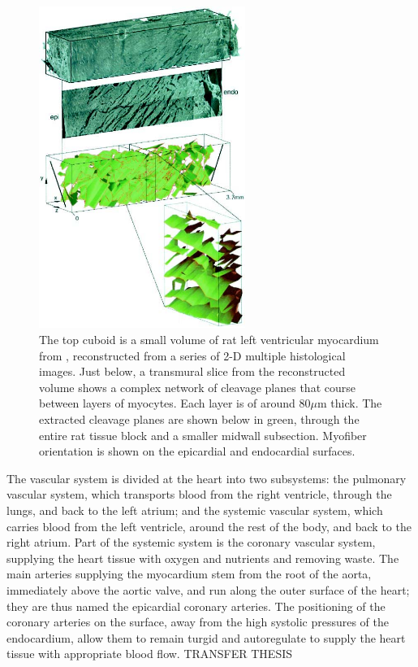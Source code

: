   \begin{figure}[htbp]
    \centering
    \includegraphics[width=0.6\textwidth]{Ch2/Figs/sheets}
    \caption{The top cuboid is a small volume of rat left ventricular myocardium from \cite{Hooks2002}, reconstructed from a series of 2-D multiple histological images. Just below, a transmural slice from the reconstructed volume shows a complex network of cleavage planes that course between layers of myocytes. Each layer is of around 80$\mu$m thick. The extracted cleavage planes are shown below in green, through the entire rat tissue block and a smaller midwall subsection. Myofiber orientation is shown on the epicardial and endocardial surfaces.}
    \label{fig:sheets}
  \end{figure}

  The vascular system is divided at the heart into two subsystems: the pulmonary vascular system, which transports blood from the right ventricle, through the lungs, and back to the left atrium; and the systemic vascular system, which carries blood from the left ventricle, around the rest of the body, and back to the right atrium. Part of the systemic system is the coronary vascular system, supplying the heart tissue with oxygen and nutrients and removing waste. The main arteries supplying the myocardium stem from the root of the aorta, immediately above the aortic valve, and run along the outer surface of the heart; they are thus named the epicardial coronary arteries. The positioning of the coronary arteries on the surface, away from the high systolic pressures of the endocardium, allow them to remain turgid and autoregulate to supply the heart tissue with appropriate blood flow.
TRANSFER THESIS


